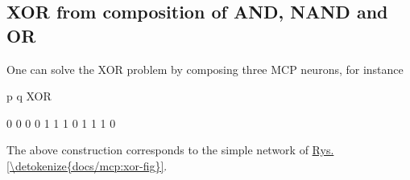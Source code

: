 \documentclass[a4paper,12pt,polish]{jupyterBook}
\begin{document}
\subsection{XOR from composition of AND, NAND and OR}
\label{\detokenize{docs/mcp:xor-from-composition-of-and-nand-and-or}}
\sphinxAtStartPar
One can solve the XOR problem by composing three MCP neurons, for instance
\begin{sphinxVerbatimInput}

\begin{sphinxVerbatim}[commandchars=\\\{\}]
   
\end{sphinxVerbatim}
\end{sphinxVerbatimInput}
\begin{sphinxVerbatimInput}

\begin{sphinxVerbatim}[commandchars=\\\{\}]

   \PYG{p}{[}\PYG{p}{]} 
       \PYG{p}{[}\PYG{p}{]} 
\end{sphinxVerbatim}
\end{sphinxVerbatimInput}
\begin{sphinxVerbatimOutput}

\begin{sphinxVerbatim}[commandchars=\\\{\}]
p q XOR

0 0  0
0 1  1
1 0  1
1 1  0
\end{sphinxVerbatim}
\end{sphinxVerbatimOutput}

\sphinxAtStartPar
The above construction corresponds to the simple network of \hyperref[\detokenize{docs/mcp:xor-fig}]{Rys.\@ \ref{\detokenize{docs/mcp:xor-fig}}}.
\end{document}
